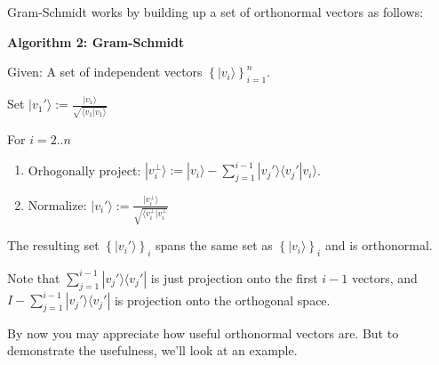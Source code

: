 \documentclass{amsbook}
\begin{document}
Gram-Schmidt works by building up a set of orthonormal vectors as follows:

\begin{tcolorbox}[title=Algorithm 2: Gram-Schmidt,colback=blue!5]
  {\bfseries\Large Algorithm 2: Gram-Schmidt}\label{Algorithm1}
  
Given: A set of independent vectors $\left\{|v_i\rangle\right\}_{i=1}^n$.

Set $|v_1'\rangle:=\frac{|v_1\rangle}{\sqrt{\langle v_1|v_1\rangle}}$

For $i=2..n$

\begin{enumerate}
  \item Orhogonally project:  $|v_i^\bot\rangle:=|v_i\rangle-\sum_{j=1}^{i-1}|v_j'\rangle\langle v_j'|v_i\rangle$.
  \item Normalize:  $|v_i'\rangle:=\frac{|v_i^\bot\rangle}{\sqrt{\langle v_i^\bot|v_i^\bot}}$
\end{enumerate}

The resulting set $\left\{|v_i'\rangle\right\}_i$ spans the same set as $\left\{|v_i\rangle\right\}_i$ and is orthonormal.
\end{tcolorbox}

Note that $\sum_{j=1}^{i-1}|v_j'\rangle\langle v_j'|$ is just projection onto the first $i-1$ vectors, and $I-\sum_{j=1}^{i-1}|v_j'\rangle\langle v_j'|$ is projection onto the orthogonal space.

By now you may appreciate how useful orthonormal vectors are.  But to demonstrate the usefulness, we'll look at an example.
\end{document}
